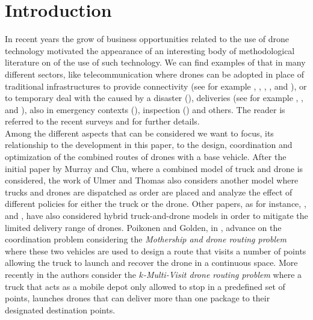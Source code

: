 \section{Introduction}
In recent years\RE{,} the grow of  business opportunities related to the use of drone technology  motivated the appearance of an interesting body of methodological literature on  of the use of such technology. 
We can find examples of that in many different sectors, like telecommunication where drones can be adopted in place of traditional infrastructures to provide connectivity (see\RE{,} for example \cite{art:Amorosi2018}, \cite{art:Chiaraviglio2018}, \cite{Jimenez2018}, \cite{art:Amorosi2019}, and \cite{art:Chiaraviglio2019a}), or to temporary deal with the  caused by a disaster (\cite{art:Chiaraviglio2019}), deliveries (see\RE{,} for example \cite{art:Mathew2015} , \cite{art:Ferrandez2016}, \cite{art:Poikonen2020} and \cite{art:Amorosi2020}), also in emergency contexts (\cite{art:Wen2016}), inspection (\cite{art:Trotta2018}) and others.
The reader is referred to the recent surveys \cite{art:Otto2018} and \cite{art:Chung2020} for further details.\\
\noindent
Among the different aspects that can be considered\RE{,} we want to focus,  its relationship to the development in this paper, to the design, coordination and optimization of the combined routes of drones with a base vehicle. After the initial paper \cite{MURRAY201586} by Murray and Chu, where a combined model of truck and drone is considered, the work of Ulmer and Thomas \cite{Ulmer2018} also considers another model where trucks and drones are dispatched as  order are placed and analyze the effect of different policies for either the truck or the drone. Other papers, as\RE{,} for instance, \cite{art:Campbell2017}, \cite{art:Carlsson2017} and \cite{art:Dayarian2017}, have also considered hybrid truck-and-drone models in order to mitigate the limited delivery range of drones. Poikonen and Golden, in \cite{Poikonen2019}, advance on the coordination problem considering the \textit{Mothership and drone routing problem} where these two vehicles are used to design a route that visits a number of points allowing the truck to launch and recover the drone in a continuous space. More recently in \cite{art:Poikonen2020} the authors consider the \textit{$k$-Multi-Visit drone routing problem} where a truck that acts as a mobile depot only allowed to stop in a predefined set of points, launches drones that can deliver more than one package to their designated destination points.
